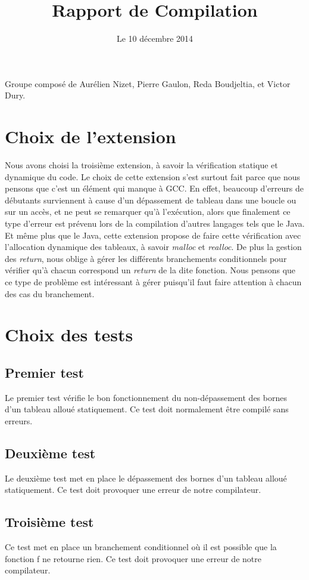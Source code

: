 \documentclass[a4paper,11pt]{article}
\begin{document}
\title{Rapport de Compilation}
\date{Le 10 décembre 2014}
\maketitle

\begin{center}
  Groupe composé de Aurélien Nizet, Pierre Gaulon, Reda Boudjeltia, et Victor Dury.
\end{center}

\section{Choix de l'extension}
Nous avons choisi la troisième extension, à savoir la vérification statique et dynamique du code. Le choix de cette extension s'est surtout fait parce que nous pensons que c'est un élément qui manque à GCC. En effet, beaucoup d'erreurs de débutants surviennent à cause d'un dépassement de tableau dans une boucle ou sur un accès, et ne peut se remarquer qu'à l'exécution, alors que finalement ce type d'erreur est prévenu lors de la compilation d'autres langages tels que le Java. Et même plus que le Java, cette extension propose de faire cette vérification avec l'allocation dynamique des tableaux, à savoir \textit{malloc} et \textit{realloc}.
De plus la gestion des \textit{return}, nous oblige à gérer les différents branchements conditionnels pour vérifier qu'à chacun correspond un \textit{return} de la dite fonction. Nous pensons que ce type de problème est intéressant à gérer puisqu'il faut faire attention à chacun des cas du branchement.

\section{Choix des tests}
\subsection{Premier test}
Le premier test vérifie le bon fonctionnement du non-dépassement des bornes d'un tableau alloué statiquement. Ce test doit normalement être compilé sans erreurs.
\subsection{Deuxième test}
Le deuxième test met en place le dépassement des bornes d'un tableau alloué statiquement. Ce test doit provoquer une erreur de notre compilateur.
\subsection{Troisième test}
Ce test met en place un branchement conditionnel où il est possible que la fonction f ne retourne rien. Ce test doit provoquer une erreur de notre compilateur.
\end{document}
